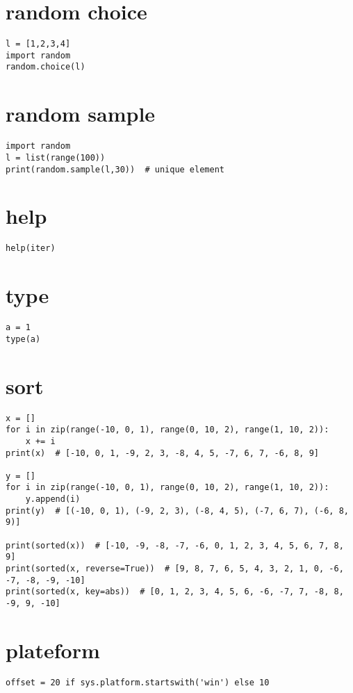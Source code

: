 \documentclass[11pt]{article}
\begin{document}
\section{random choice}
\label{sec-14}
\begin{verbatim}
l = [1,2,3,4]
import random
random.choice(l)
\end{verbatim}

\section{random sample}
\label{sec-15}
\begin{verbatim}
import random
l = list(range(100))
print(random.sample(l,30))  # unique element
\end{verbatim}
\section{help}
\label{sec-16}
\begin{verbatim}
help(iter)
\end{verbatim}


\section{type}
\label{sec-17}
\begin{verbatim}
a = 1
type(a)
\end{verbatim}


\section{sort}
\label{sec-18}
\begin{verbatim}
x = []
for i in zip(range(-10, 0, 1), range(0, 10, 2), range(1, 10, 2)):
    x += i
print(x)  # [-10, 0, 1, -9, 2, 3, -8, 4, 5, -7, 6, 7, -6, 8, 9]

y = []
for i in zip(range(-10, 0, 1), range(0, 10, 2), range(1, 10, 2)):
    y.append(i)
print(y)  # [(-10, 0, 1), (-9, 2, 3), (-8, 4, 5), (-7, 6, 7), (-6, 8, 9)]

print(sorted(x))  # [-10, -9, -8, -7, -6, 0, 1, 2, 3, 4, 5, 6, 7, 8, 9]
print(sorted(x, reverse=True))  # [9, 8, 7, 6, 5, 4, 3, 2, 1, 0, -6, -7, -8, -9, -10]
print(sorted(x, key=abs))  # [0, 1, 2, 3, 4, 5, 6, -6, -7, 7, -8, 8, -9, 9, -10]
\end{verbatim}

\section{plateform}
\label{sec-19}
\begin{verbatim}
offset = 20 if sys.platform.startswith('win') else 10
\end{verbatim}
\end{document}
